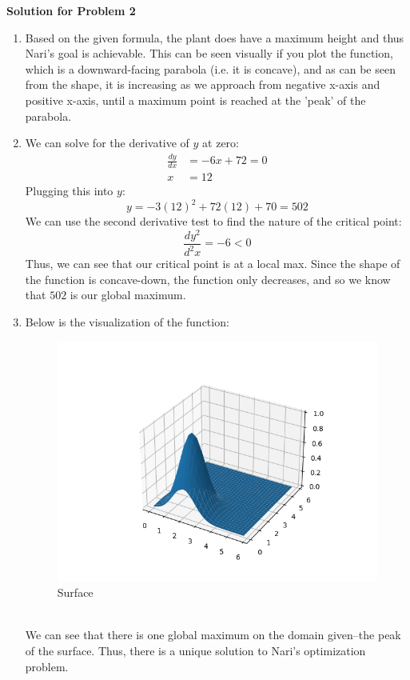 \documentclass{harvardml}
\theoremstyle{definition}
\theoremstyle{plain}
\begin{document}
\textbf{Solution for Problem 2}
\begin{enumerate}
\item 
    Based on the given formula, the plant does have a maximum height and thus Nari's goal is achievable. This can be seen visually if you plot the function, which is a downward-facing parabola (i.e. it is concave), and as can be seen from the shape, it is increasing as we approach from negative x-axis and positive x-axis, until a maximum point is reached at the 'peak' of the parabola.

\item
    We can solve for the derivative of $y$ at zero:
    \begin{align*}
        \frac{dy}{dx} &= -6x + 72 = 0\\
        x &= 12
    \end{align*}
    Plugging this into $y$:
    \begin{equation*}
        y = -3(12)^2 + 72(12) + 70 = 502
    \end{equation*}
    We can use the second derivative test to find the nature of the critical point:
    \begin{equation*}
        \frac{dy^2}{d^2x} = -6 < 0
    \end{equation*}
    Thus, we can see that our critical point is at a local max. Since the shape of the function is concave-down, the function only decreases, and so we know that $502$ is our global maximum.

\item
    Below is the visualization of the function:\\
    \begin{figure}[h]
        \centering
        \includegraphics[scale=0.5]{images/q-2-3.png}
        \caption{Surface}
        \label{fig:q-2-3}
    \end{figure}\\
    We can see that there is one global maximum on the domain given--the peak of the surface. Thus, there is a unique solution to Nari's optimization problem.
\end{enumerate}
\end{document}

